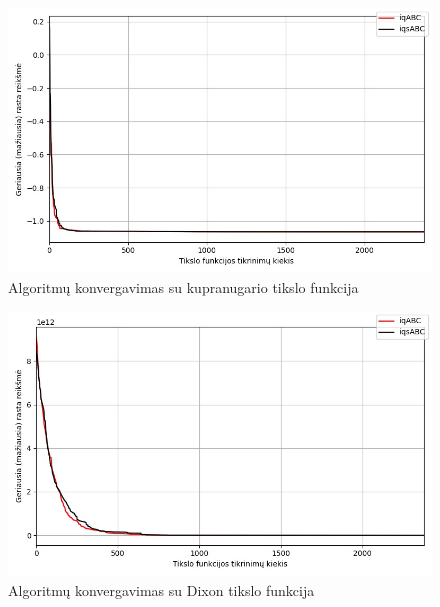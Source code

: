 \documentclass{VUMIFKompMagistrinis}
\begin{document}
\begin{landscape}
\begin{multicols}{2}
\end{multicols}
\begin{multicols}{2}

\begin{figure}[H]
    \centering
    \includegraphics[scale=0.45]{img/2kg/camel.jpg}
     \caption{Algoritmų konvergavimas su kupranugario tikslo funkcija}
    \label{img:vkon3}
\end{figure}

\begin{figure}[H]
    \centering
    \includegraphics[scale=0.45]{img/2kg/dixon.jpg}
     \caption{Algoritmų konvergavimas su Dixon tikslo funkcija}
    \label{img:vkon4}
\end{figure}

\end{multicols}\newpage
\begin{multicols}{2}


\end{multicols}
\end{landscape}
\end{document}
